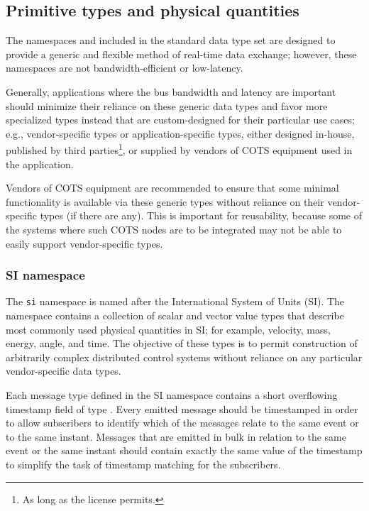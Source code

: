 \subsection{Primitive types and physical quantities}

The namespaces  and 
included in the standard data type set are designed to provide a generic and flexible
method of real-time data exchange; however, these namespaces are not bandwidth-efficient
or low-latency.

Generally, applications where the bus bandwidth and latency are important should minimize their reliance
on these generic data types and favor more specialized types instead that are custom-designed for their
particular use cases; e.g., vendor-specific types or application-specific types, either
designed in-house, published by third parties\footnote{As long as the license permits.}, or supplied by
vendors of COTS equipment used in the application.

Vendors of COTS equipment are recommended to ensure that some minimal functionality is available
via these generic types without reliance on their vendor-specific types (if there are any).
This is important for reusability, because some of the systems where such COTS nodes are
to be integrated may not be able to easily support vendor-specific types.

\subsubsection{SI namespace}

The \verb|si| namespace is named after the International System of Units (SI).
The namespace contains a collection of scalar and vector value types that describe most commonly used
physical quantities in SI; for example, velocity, mass, energy, angle, and time.
The objective of these types is to permit construction of arbitrarily complex distributed control systems without
reliance on any particular vendor-specific data types.

Each message type defined in the SI namespace contains a short overflowing timestamp field of type
.
Every emitted message should be timestamped in order to allow subscribers to identify which of the messages
relate to the same event or to the same instant.
Messages that are emitted in bulk in relation to the same event or the same instant should contain
exactly the same value of the timestamp
to simplify the task of timestamp matching for the subscribers.

